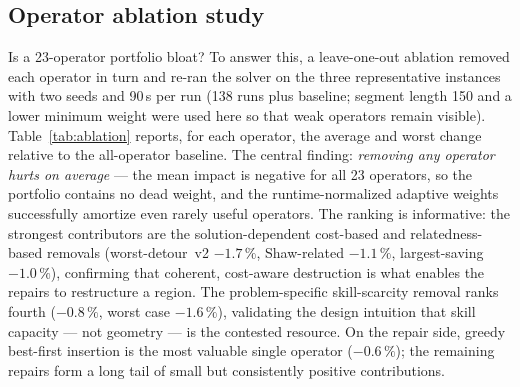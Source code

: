 \documentclass[10pt, a4paper]{article}
\begin{document}
\subsection{Operator ablation study}\label{sec:exp-ablation}
Is a 23-operator portfolio bloat? To answer this, a leave-one-out ablation
removed each operator in turn and re-ran the solver on the three
representative instances with two seeds and 90\,s per run (138 runs plus
baseline; segment length 150 and a lower minimum weight were used here so
that weak operators remain visible). Table~\ref{tab:ablation} reports, for
each operator, the average and worst change relative to the all-operator
baseline. The central finding: \emph{removing any operator hurts on
average} --- the mean impact is negative for all 23 operators, so the
portfolio contains no dead weight, and the runtime-normalized adaptive
weights successfully amortize even rarely useful operators. The ranking is
informative: the strongest contributors are the solution-dependent
cost-based and relatedness-based removals (worst-detour~v2 $-1.7\,\%$,
Shaw-related $-1.1\,\%$, largest-saving $-1.0\,\%$), confirming that
coherent, cost-aware destruction is what enables the repairs to restructure
a region. The problem-specific skill-scarcity removal ranks fourth
($-0.8\,\%$, worst case $-1.6\,\%$), validating the design intuition that
skill capacity --- not geometry --- is the contested resource. On the repair
side, greedy best-first insertion is the most valuable single operator
($-0.6\,\%$); the remaining repairs form a long tail of small but
consistently positive contributions.
\end{document}
